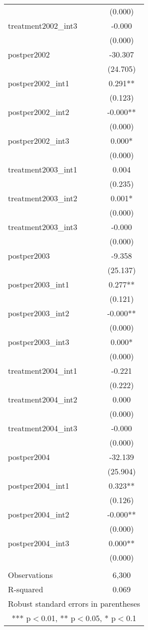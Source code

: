 \documentclass[]{article}
\begin{document}
\begin{tabular}{lc}
 & (0.000) \\
treatment2002\_int3 & -0.000 \\
 & (0.000) \\
postper2002 & -30.307 \\
 & (24.705) \\
postper2002\_int1 & 0.291** \\
 & (0.123) \\
postper2002\_int2 & -0.000** \\
 & (0.000) \\
postper2002\_int3 & 0.000* \\
 & (0.000) \\
treatment2003\_int1 & 0.004 \\
 & (0.235) \\
treatment2003\_int2 & 0.001* \\
 & (0.000) \\
treatment2003\_int3 & -0.000 \\
 & (0.000) \\
postper2003 & -9.358 \\
 & (25.137) \\
postper2003\_int1 & 0.277** \\
 & (0.121) \\
postper2003\_int2 & -0.000** \\
 & (0.000) \\
postper2003\_int3 & 0.000* \\
 & (0.000) \\
treatment2004\_int1 & -0.221 \\
 & (0.222) \\
treatment2004\_int2 & 0.000 \\
 & (0.000) \\
treatment2004\_int3 & -0.000 \\
 & (0.000) \\
postper2004 & -32.139 \\
 & (25.904) \\
postper2004\_int1 & 0.323** \\
 & (0.126) \\
postper2004\_int2 & -0.000** \\
 & (0.000) \\
postper2004\_int3 & 0.000** \\
 & (0.000) \\
 &  \\
Observations & 6,300 \\
 R-squared & 0.069 \\ \hline
\multicolumn{2}{c}{ Robust standard errors in parentheses} \\
\multicolumn{2}{c}{ *** p$<$0.01, ** p$<$0.05, * p$<$0.1} \\
\end{tabular}
\end{document}

